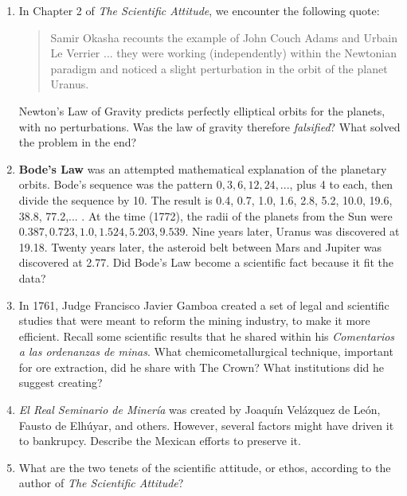 \documentclass[10pt]{article}
\begin{document}
\begin{enumerate}
\item In Chapter 2 of \textit{The Scientific Attitude}, we encounter the following quote:
\begin{quotation}
Samir Okasha recounts the example of John Couch Adams and Urbain Le Verrier ... they were working (independently) within the Newtonian paradigm and noticed a slight perturbation in the orbit of the planet Uranus.
\end{quotation}
Newton's Law of Gravity predicts perfectly elliptical orbits for the planets, with no perturbations.  Was the law of gravity therefore \textit{falsified}?  What solved the problem in the end? \\ \vspace{0.5cm}
\item \textbf{Bode's Law} was an attempted mathematical explanation of the planetary orbits.  Bode's sequence was the pattern $0, 3, 6, 12, 24,...$, plus 4 to each, then divide the sequence by 10.  The result is 0.4, 0.7, 1.0, 1.6, 2.8, 5.2, 10.0, 19.6, 38.8, 77.2,... .  At the time (1772), the radii of the planets from the Sun were $0.387, 0.723, 1.0, 1.524, 5.203, 9.539$.  Nine years later, Uranus was discovered at 19.18.  Twenty years later, the asteroid belt between Mars and Jupiter was discovered at 2.77.  Did Bode's Law become a scientific fact because it fit the data? \\ \vspace{1cm}
\item In 1761, Judge Francisco Javier Gamboa created a set of legal and scientific studies that were meant to reform the mining industry, to make it more efficient.  Recall some scientific results that he shared within his \textit{Comentarios a las ordenanzas de minas}.  What chemicometallurgical technique, important for ore extraction, did he share with The Crown?  What institutions did he suggest creating? \\ \vspace{1.0cm}
\item \textit{El Real Seminario de Miner\'{i}a} was created by Joaqu\'{i}n Vel\'{a}zquez de Le\'{o}n, Fausto de Elh\'{u}yar, and others.  However, several factors might have driven it to bankrupcy.  Describe the Mexican efforts to preserve it. \\ \vspace{1.0cm}
\item What are the two tenets of the scientific attitude, or ethos, according to the author of \textit{The Scientific Attitude}? \\ \vspace{0.5cm}

\end{enumerate}
\end{document}
